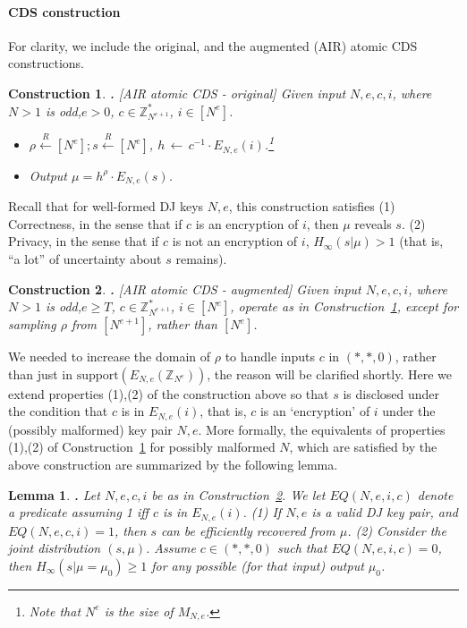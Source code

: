 \documentclass{article}
\newcommand{\encr}[2]{E_{#1}(#2)}
\newcommand{\encdj}{{E}_{N,e}}
\newcommand{\support}{{\mathrm{support}}}
\newcommand{\plain}{{{M}}}
\newcommand{\plaintext}[1]{\plain_{#1}}
\newcommand{\Z}{{\mathbb{Z}}}
\newtheorem{LEMMA}{Lemma}[section]
\newenvironment{lemma}{\begin{LEMMA} \hspace{-.85em} {\bf .} \rm}%
	{\end{LEMMA}}
\newtheorem{CONSTRUCTION}{Construction}[section]
\newenvironment{construction}{\begin{CONSTRUCTION} \hspace{-.85em} {\bf .} \rm}%
	{\end{CONSTRUCTION}}
\newcommand{\from}{{\,\leftarrow\,}}
\newcommand{\samp}[2]{#1\from #2}
\newcommand{\usamp}[2]{#1\stackrel{R}{\leftarrow}#2}
\newcommand{\U}[1]{\mathbb{Z}_{#1}^*}
\begin{document}
\paragraph{CDS construction}
For clarity, we include the original, and the augmented (AIR) atomic CDS constructions.
\begin{construction}[AIR atomic CDS - original]
\label{con-air-cds-orig}
Given input $N,e,c,i$, where $N>1$ is odd,$e>0$, $c\in \U{N^{e+1}}$, $i\in [N^e]$.
\begin{itemize}
  \item $\usamp{\rho}{[N^e]};\usamp{s}{[N^e]}$, $\samp{h}{c^{-1}\cdot \encr{N,e}{i}}$.\footnote{Note that $N^e$
    is the size of $\plaintext{N,e}$.}
    \item Output $\mu=h^{\rho}\cdot\encr{N,e}{s}$.
  \end{itemize}
\end{construction}
Recall that for well-formed DJ keys $N,e$, this construction satisfies (1) Correctness, in the sense that if $c$ is an encryption
of $i$, then $\mu$ reveals $s$. (2) Privacy, in the sense that if $c$ is not an encryption of $i$, $H_\infty(s|\mu)>1$
(that is, ``a lot'' of uncertainty about $s$ remains).
\begin{construction}[AIR atomic CDS - augmented]
  \label{con-air-cds-aug}
  Given input $N,e,c,i$, where $N>1$ is odd,$e\geq T$, $c\in \U{N^{e+1}}$, $i\in [N^e]$,
  operate as in Construction~\ref{con-air-cds-orig}, except for sampling $\rho$ from $[N^{e+1}]$,
  rather than $[N^e]$.
\end{construction}
We needed to increase the domain of $\rho$ to handle inputs $c$ in
$(*,*,0)$, rather than just in $\support(\encdj(\Z_{N^e}))$, the
reason will be clarified shortly. Here we extend properties (1),(2) of the construction above so that
$s$ is disclosed under the condition that $c$ is in $\encdj(i)$, that is,
$c$ is an `encryption' of $i$ under the (possibly malformed) key
pair $N,e$. More formally, the equivalents of properties (1),(2) of Construction~\ref{con-air-cds-orig} 
for possibly malformed $N$, which are satisfied by the above
construction are summarized by the following lemma.
\begin{lemma}
  \label{lem-air-cds-priv}
  Let $N,e,c,i$ be as in Construction~\ref{con-air-cds-aug}. We
  let $EQ(N,e,i,c)$ denote a predicate assuming 1 iff $c$ is in $\encdj(i)$.
  (1) If $N,e$ is a valid DJ key pair, and $EQ(N,e,c,i)=1$, then $s$ can be efficiently recovered from $\mu$.
  (2) Consider the joint distribution $(s,\mu)$. Assume $c\in (*,*,0)$ such that $EQ(N,e,i,c)=0$,
  then $H_{\infty}(s|\mu=\mu_0)\geq 1$ for any possible (for that input) output $\mu_0$.
\end{lemma}
\end{document}
